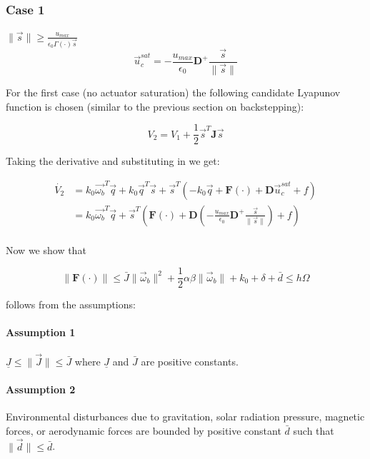 \subsection{} \label{apx:B}
\subsubsection{Case 1} $\lVert \vec{s} \rVert \geq \frac{u_{max}}{\epsilon_0\Gamma(\cdot)\vec{s}}$
\begin{equation}
\vec{u}_c^{sat} = -\frac{u_{max}}{\epsilon_0}\mathbf{D}^+ \frac{\vec{s}}{\lVert \vec{s} \rVert}
\end{equation}

For the first case (no actuator saturation) the following candidate Lyapunov function is chosen (similar to the previous section on backstepping):

\begin{equation}
    V_2=V_1 + \frac{1}{2}\vec{s}^T\mathbf{J}\vec{s}
\end{equation}

Taking the derivative and substituting in we get:

\begin{equation}
    \begin{split}
        \dot{V_2} &= k_0\vec{\omega_b}^T\vec{q} + k_0\vec{q}^T\vec{s} + \vec{s}^T(-k_0\vec{q} + \mathbf{F}(\cdot) + \mathbf{D}\vec{u}_c^{sat} + f) \\
        &=  k_0\vec{\omega_b}^T\vec{q} + \vec{s}^T(\mathbf{F}(\cdot) + \mathbf{D}(-\frac{u_{max}}{\epsilon_0}\mathbf{D}^+ \frac{\vec{s}}{\lVert \vec{s} \rVert}) + f) \\
    \end{split}
\end{equation}

Now we show that

\begin{equation}
    \lVert\mathbf{F}(\cdot)\rVert \leq \bar{J}\lVert\vec{\omega}_b\rVert^2 + \frac{1}{2}\alpha\beta\lVert\vec{\omega}_b\rVert + k_0 + \delta + \bar{d}	\leq h\Omega 
\end{equation}

follows from the assumptions:
\paragraph{Assumption 1} $\underline{J} \leq \lVert\vec{J}\rVert \leq \bar{J}$ where $\underline{J}$ and $\bar{J}$ are positive constants.

\paragraph{Assumption 2} Environmental disturbances due to gravitation, solar radiation pressure, magnetic forces, or aerodynamic forces are bounded by positive constant $\bar{d}$ such that $\lVert\vec{d}\rVert \leq \bar{d}$.

